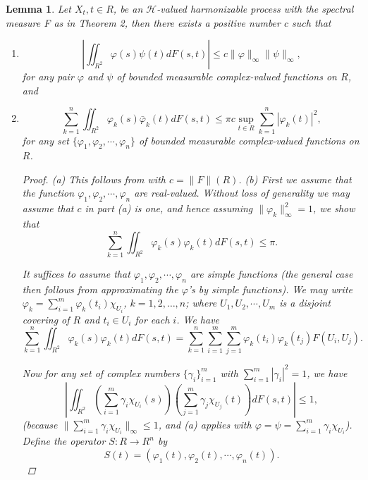 \documentclass{article}
\newtheorem{lemma}[theorem]{Lemma}
\begin{document}
\begin{lemma}
Let $X_{t}, t \in R$, be an $\mathscr{H}$-valued harmonizable process with the spectral measure F as in Theorem 2, then there exists a positive number $c$ such that
\begin{enumerate}
\item[(a)]
\begin{equation}
\left|\iint_{R^{2}} \varphi(s) \psi(t) d F(s, t)\right| \leq c\|\varphi\|_{\infty}\|\psi\|_{\infty},
\end{equation}
for any pair $\varphi$ and $\psi$ of bounded measurable complex-valued functions on $R$, and
\item[(b)]
\begin{equation}
\sum_{k=1}^{n} \iint_{R^{2}} \varphi_{k}(s) \bar{\varphi}_{k}(t) d F(s, t) \leq \pi c \sup_{t \in R} \sum_{k=1}^{n} |\varphi_{k}(t)|^2,
\end{equation}
for any set $\{\varphi_1, \varphi_2, \cdots, \varphi_n\}$ of bounded measurable complex-valued functions on $R$.

\begin{proof}
(a) This follows from \cite{rozanov} with $c = \|F\|(R)$. (b) First we assume that the function $\varphi_1, \varphi_2, \cdots, \varphi_n$ are real-valued. Without loss of generality we may assume that $c$ in part (a) is one, and hence assuming $\|\varphi_k\|_{\infty}^2 = 1$, we show that
\begin{equation}
\sum_{k=1}^{n} \iint_{R^{2}} \varphi_{k}(s) \varphi_{k}(t) d F(s, t) \leq \pi.
\end{equation}

It suffices to assume that $\varphi_1, \varphi_2, \cdots, \varphi_n$ are simple functions (the general case then follows from approximating the $\varphi$'s by simple functions). We may write $\varphi_k = \sum_{i=1}^{m} \varphi_k(t_i) \chi_{U_i}$, $k = 1, 2, \ldots, n$; where $U_1, U_2, \cdots, U_m$ is a disjoint covering of $R$ and $t_i \in U_i$ for each $i$. We have
\begin{equation}
\sum_{k=1}^{n} \iint_{R^{2}} \varphi_{k}(s) \varphi_{k}(t) d F(s, t) = \sum_{k=1}^{n} \sum_{i=1}^{m} \sum_{j=1}^{m} \varphi_k(t_i) \varphi_k(t_j) F(U_i, U_j).
\end{equation}

Now for any set of complex numbers $\{\gamma_i\}_{i=1}^{m}$ with $\sum_{i=1}^{m} |\gamma_i|^2 = 1$, we have
\begin{equation}
\left| \iint_{R^{2}} \left(\sum_{i=1}^{m} \gamma_i \chi_{U_i}(s)\right) \left(\sum_{j=1}^{m} \gamma_j \chi_{U_j}(t)\right) d F(s, t) \right| \leq 1,
\end{equation}
(because $\|\sum_{i=1}^{m} \gamma_i \chi_{U_i}\|_{\infty} \leq 1$, and (a) applies with $\varphi = \psi = \sum_{i=1}^{m} \gamma_i \chi_{U_i}$). Define the operator $S : R \to R^n$ by
\begin{equation}
S(t) = (\varphi_1(t), \varphi_2(t), \cdots, \varphi_n(t)).
\end{equation}


\end{proof}
\end{enumerate}
\end{lemma}
\end{document}
